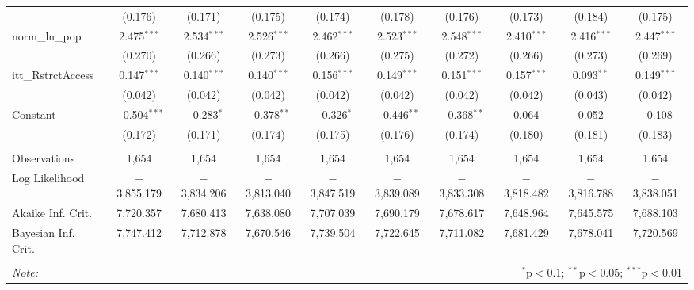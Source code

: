 \begin{sidewaystable}[!htbp]
\begin{tabular}{@{\extracolsep{5pt}}lccccccccc}
  & (0.176) & (0.171) & (0.175) & (0.174) & (0.178) & (0.176) & (0.173) & (0.184) & (0.175) \\ 
  norm\_ln\_pop & 2.475$^{***}$ & 2.534$^{***}$ & 2.526$^{***}$ & 2.462$^{***}$ & 2.523$^{***}$ & 2.548$^{***}$ & 2.410$^{***}$ & 2.416$^{***}$ & 2.447$^{***}$ \\ 
  & (0.270) & (0.266) & (0.273) & (0.266) & (0.275) & (0.272) & (0.266) & (0.273) & (0.269) \\ 
  itt\_RstrctAccess & 0.147$^{***}$ & 0.140$^{***}$ & 0.140$^{***}$ & 0.156$^{***}$ & 0.149$^{***}$ & 0.151$^{***}$ & 0.157$^{***}$ & 0.093$^{**}$ & 0.149$^{***}$ \\ 
  & (0.042) & (0.042) & (0.042) & (0.042) & (0.042) & (0.042) & (0.042) & (0.043) & (0.042) \\ 
  Constant & $-$0.504$^{***}$ & $-$0.283$^{*}$ & $-$0.378$^{**}$ & $-$0.326$^{*}$ & $-$0.446$^{**}$ & $-$0.368$^{**}$ & 0.064 & 0.052 & $-$0.108 \\ 
  & (0.172) & (0.171) & (0.174) & (0.175) & (0.176) & (0.174) & (0.180) & (0.181) & (0.183) \\ 
 \hline \\[-1.8ex] 
Observations & 1,654 & 1,654 & 1,654 & 1,654 & 1,654 & 1,654 & 1,654 & 1,654 & 1,654 \\ 
Log Likelihood & $-$3,855.179 & $-$3,834.206 & $-$3,813.040 & $-$3,847.519 & $-$3,839.089 & $-$3,833.308 & $-$3,818.482 & $-$3,816.788 & $-$3,838.051 \\ 
Akaike Inf. Crit. & 7,720.357 & 7,680.413 & 7,638.080 & 7,707.039 & 7,690.179 & 7,678.617 & 7,648.964 & 7,645.575 & 7,688.103 \\ 
Bayesian Inf. Crit. & 7,747.412 & 7,712.878 & 7,670.546 & 7,739.504 & 7,722.645 & 7,711.082 & 7,681.429 & 7,678.041 & 7,720.569 \\ 
\hline 
\hline \\[-1.8ex] 
\textit{Note:}  & \multicolumn{9}{r}{$^{*}$p$<$0.1; $^{**}$p$<$0.05; $^{***}$p$<$0.01} \\ 
\end{tabular} 
\end{sidewaystable} 
